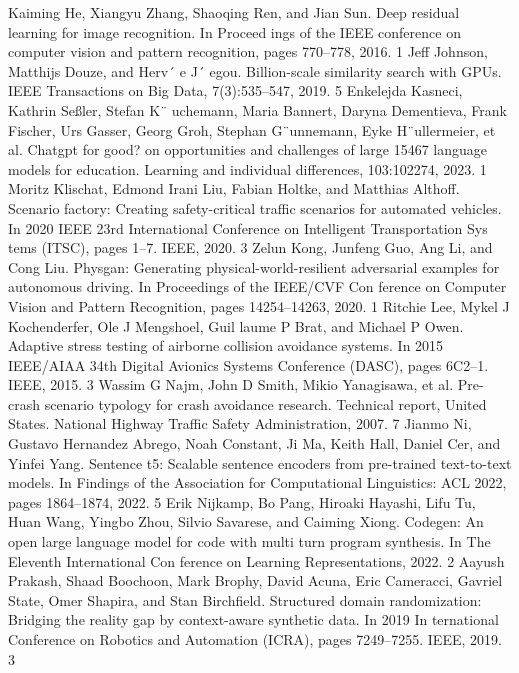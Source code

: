 \documentclass{article}
\begin{document}
\begin{thebibliography}{99}
	Kaiming He, Xiangyu Zhang, Shaoqing Ren, and Jian Sun. Deep residual learning for image recognition. In Proceed ings of the IEEE conference on computer vision and pattern recognition, pages 770–778, 2016. 1 
	Jeff Johnson, Matthijs Douze, and Herv´ e J´ egou. Billion-scale similarity search with GPUs. IEEE Transactions on Big Data, 7(3):535–547, 2019. 5 
	Enkelejda Kasneci, Kathrin Seßler, Stefan K¨ uchemann, Maria Bannert, Daryna Dementieva, Frank Fischer, Urs Gasser, Georg Groh, Stephan G¨unnemann, Eyke H¨ullermeier, et al. Chatgpt for good? on opportunities and challenges of large 15467 language models for education. Learning and individual differences, 103:102274, 2023. 1 
	Moritz Klischat, Edmond Irani Liu, Fabian Holtke, and Matthias Althoff. Scenario factory: Creating safety-critical traffic scenarios for automated vehicles. In 2020 IEEE 23rd International Conference on Intelligent Transportation Sys tems (ITSC), pages 1–7. IEEE, 2020. 3 
	Zelun Kong, Junfeng Guo, Ang Li, and Cong Liu. Physgan: Generating physical-world-resilient adversarial examples for autonomous driving. In Proceedings of the IEEE/CVF Con ference on Computer Vision and Pattern Recognition, pages 14254–14263, 2020. 1
	Ritchie Lee, Mykel J Kochenderfer, Ole J Mengshoel, Guil laume P Brat, and Michael P Owen. Adaptive stress testing of airborne collision avoidance systems. In 2015 IEEE/AIAA 34th Digital Avionics Systems Conference (DASC), pages 6C2–1. IEEE, 2015. 3 
	Wassim G Najm, John D Smith, Mikio Yanagisawa, et al. Pre-crash scenario typology for crash avoidance research. Technical report, United States. National Highway Traffic Safety Administration, 2007. 7 
	Jianmo Ni, Gustavo Hernandez Abrego, Noah Constant, Ji Ma, Keith Hall, Daniel Cer, and Yinfei Yang. Sentence t5: Scalable sentence encoders from pre-trained text-to-text models. In Findings of the Association for Computational Linguistics: ACL 2022, pages 1864–1874, 2022. 5
	Erik Nijkamp, Bo Pang, Hiroaki Hayashi, Lifu Tu, Huan Wang, Yingbo Zhou, Silvio Savarese, and Caiming Xiong. Codegen: An open large language model for code with multi turn program synthesis. In The Eleventh International Con ference on Learning Representations, 2022. 2 
	Aayush Prakash, Shaad Boochoon, Mark Brophy, David Acuna, Eric Cameracci, Gavriel State, Omer Shapira, and Stan Birchfield. Structured domain randomization: Bridging the reality gap by context-aware synthetic data. In 2019 In ternational Conference on Robotics and Automation (ICRA), pages 7249–7255. IEEE, 2019. 3

\end{thebibliography}
\end{document}
